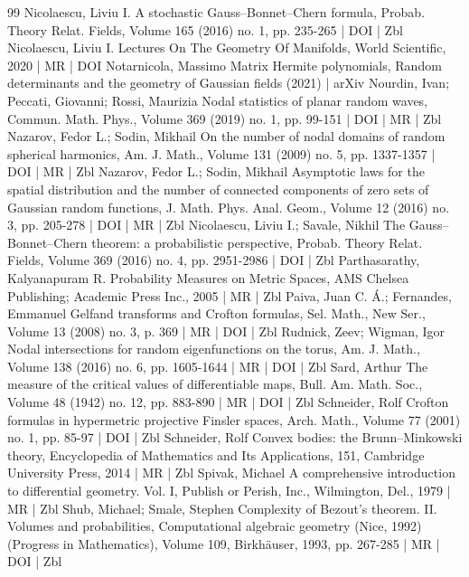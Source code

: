\begin{thebibliography}{99}
Nicolaescu, Liviu I. A stochastic Gauss–Bonnet–Chern formula, Probab. Theory Relat. Fields, Volume 165 (2016) no. 1, pp. 235-265 | DOI | Zbl
Nicolaescu, Liviu I. Lectures On The Geometry Of Manifolds, World Scientific, 2020 | MR | DOI
Notarnicola, Massimo Matrix Hermite polynomials, Random determinants and the geometry of Gaussian fields (2021) | arXiv
Nourdin, Ivan; Peccati, Giovanni; Rossi, Maurizia Nodal statistics of planar random waves, Commun. Math. Phys., Volume 369 (2019) no. 1, pp. 99-151 | DOI | MR | Zbl
Nazarov, Fedor L.; Sodin, Mikhail On the number of nodal domains of random spherical harmonics, Am. J. Math., Volume 131 (2009) no. 5, pp. 1337-1357 | DOI | MR | Zbl
Nazarov, Fedor L.; Sodin, Mikhail Asymptotic laws for the spatial distribution and the number of connected components of zero sets of Gaussian random functions, J. Math. Phys. Anal. Geom., Volume 12 (2016) no. 3, pp. 205-278 | DOI | MR | Zbl
Nicolaescu, Liviu I.; Savale, Nikhil The Gauss–Bonnet–Chern theorem: a probabilistic perspective, Probab. Theory Relat. Fields, Volume 369 (2016) no. 4, pp. 2951-2986 | DOI | Zbl
Parthasarathy, Kalyanapuram R. Probability Measures on Metric Spaces, AMS Chelsea Publishing; Academic Press Inc., 2005 | MR | Zbl
Paiva, Juan C. Á.; Fernandes, Emmanuel Gelfand transforms and Crofton formulas, Sel. Math., New Ser., Volume 13 (2008) no. 3, p. 369 | MR | DOI | Zbl
Rudnick, Zeev; Wigman, Igor Nodal intersections for random eigenfunctions on the torus, Am. J. Math., Volume 138 (2016) no. 6, pp. 1605-1644 | MR | DOI | Zbl
Sard, Arthur The measure of the critical values of differentiable maps, Bull. Am. Math. Soc., Volume 48 (1942) no. 12, pp. 883-890 | MR | DOI | Zbl
Schneider, Rolf Crofton formulas in hypermetric projective Finsler spaces, Arch. Math., Volume 77 (2001) no. 1, pp. 85-97 | DOI | Zbl
Schneider, Rolf Convex bodies: the Brunn–Minkowski theory, Encyclopedia of Mathematics and Its Applications, 151, Cambridge University Press, 2014 | MR | Zbl
Spivak, Michael A comprehensive introduction to differential geometry. Vol. I, Publish or Perish, Inc., Wilmington, Del., 1979 | MR | Zbl
Shub, Michael; Smale, Stephen Complexity of Bezout’s theorem. II. Volumes and probabilities, Computational algebraic geometry (Nice, 1992) (Progress in Mathematics), Volume 109, Birkhäuser, 1993, pp. 267-285 | MR | DOI | Zbl

\end{thebibliography}

